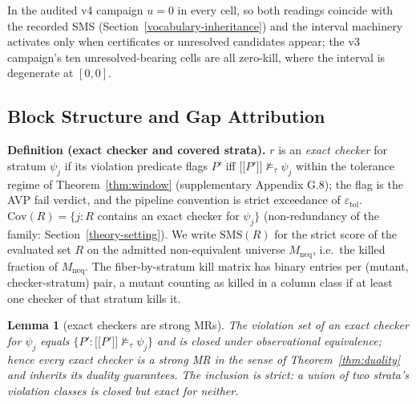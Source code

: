 \documentclass[review,12pt,authoryear]{elsarticle}
\providecommand{\llbracket}{\mathopen{\lbrack\!\lbrack}}
\providecommand{\rrbracket}{\mathclose{\rbrack\!\rbrack}}
\newtheorem{lemma}[theorem]{Lemma}
\begin{document}
In the audited v4 campaign $u = 0$ in every cell, so both readings
coincide with the recorded SMS
(Section~\ref{vocabulary-inheritance}) and the interval machinery
activates only when certificates or unresolved candidates appear; the
v3 campaign's ten unresolved-bearing cells are all zero-kill, where the
interval is degenerate at $[0, 0]$.

\subsection{Block Structure and Gap Attribution}\label{theory-gap}

\textbf{Definition (exact checker and covered strata).} $r$ is an
\emph{exact checker} for stratum $\psi_j$ if its violation predicate
flags $P'$ iff
$\llbracket P' \rrbracket \not\models_{\tau} \psi_j$
within the tolerance regime of Theorem~\ref{thm:window} (supplementary
Appendix G.8); the flag is the AVP fail verdict, and the pipeline
convention is strict exceedance of $\varepsilon_{\mathrm{tol}}$.
$\mathrm{Cov}(R) = \{j : R$ contains an exact checker for $\psi_j\}$
(non-redundancy of the family: Section~\ref{theory-setting}). We write
$\mathrm{SMS}(R)$ for the strict score of the evaluated set $R$ on the
admitted non-equivalent universe $M_{\mathrm{neq}}$, i.e.\ the killed
fraction of $M_{\mathrm{neq}}$. The fiber-by-stratum kill matrix has
binary entries per (mutant, checker-stratum) pair, a mutant counting as
killed in a column class if at least one checker of that stratum kills
it.

\begin{lemma}[exact checkers are strong MRs]\label{lem:closure}
The violation set of an exact checker for $\psi_j$ equals
$\{P' : \llbracket P' \rrbracket \not\models_{\tau} \psi_j\}$
and is closed under observational equivalence; hence every exact checker
is a strong MR in the sense of Theorem~\ref{thm:duality} and inherits
its duality guarantees. The inclusion is strict: a union of two strata's
violation classes is closed but exact for neither.
\end{lemma}
\end{document}
